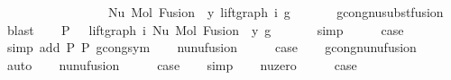 \begin{isabellebody}
\ \ \ \ \ \ \ \ \ \ \ \ \ \ \ \ \ Nu\ {\isacharparenleft}{\kern0pt}Mol\ {\isacharparenleft}{\kern0pt}Fusion\ {}\ y{\isacharparenright}{\kern0pt}\ {\isacharparenleft}{\kern0pt}lift{\isacharunderscore}{\kern0pt}graph\ i\ g{\isacharparenright}{\kern0pt}{\isacharparenright}{\kern0pt}{\isachardoublequoteclose}\isanewline
\ \ \ \ \ \isamarkupfalse%
\ gcong{\isachardot}{\kern0pt}nu{\isacharunderscore}{\kern0pt}subst{\isacharunderscore}{\kern0pt}fusion{}\ \isamarkupfalse%
\ blast\isanewline
\ \ \isamarkupfalse%
\ P{}{\isacharcolon}{\kern0pt}\ {\isachardoublequoteopen}{\isachardot}{\kern0pt}{\isachardot}{\kern0pt}{\isachardot}{\kern0pt}\ {\isacharequal}{\kern0pt}\ lift{\isacharunderscore}{\kern0pt}graph\ i\ {\isacharparenleft}{\kern0pt}Nu\ {\isacharparenleft}{\kern0pt}Mol\ {\isacharparenleft}{\kern0pt}Fusion\ {}\ y{\isacharparenright}{\kern0pt}\ g{\isacharparenright}{\kern0pt}{\isacharparenright}{\kern0pt}{\isachardoublequoteclose}\isanewline
\ \ \ \ \ \isamarkupfalse%
\ simp\isanewline
\ \ \isamarkupfalse%
\ \isamarkupfalse%
\ {\isacharquery}{\kern0pt}case\isanewline
\ \ \ \ \ \isamarkupfalse%
\ {\isacharparenleft}{\kern0pt}simp\ add{\isacharcolon}{\kern0pt}\ P{}\ P{}\ gcong{\isachardot}{\kern0pt}sym{\isacharparenright}{\kern0pt}\isanewline
{}\isamarkupfalse%
\isanewline
\ \ \isamarkupfalse%
\ nu{\isacharunderscore}{\kern0pt}nu{\isacharunderscore}{\kern0pt}fusion{}\isanewline
\ \ \isamarkupfalse%
\ \isamarkupfalse%
\ {\isacharquery}{\kern0pt}case\isanewline
\ \ \isamarkupfalse%
\ gcong{\isachardot}{\kern0pt}nu{\isacharunderscore}{\kern0pt}nu{\isacharunderscore}{\kern0pt}fusion{}\ \isamarkupfalse%
\ auto\isanewline
{}\isamarkupfalse%
\isanewline
\ \ \isamarkupfalse%
\ nu{\isacharunderscore}{\kern0pt}nu{\isacharunderscore}{\kern0pt}fusion{}\isanewline
\ \ \isamarkupfalse%
\ \isamarkupfalse%
\ {\isacharquery}{\kern0pt}case\isanewline
\ \ \isamarkupfalse%
\ simp\isanewline
{}\isamarkupfalse%
\isanewline
\ \ \isamarkupfalse%
\ nu{\isacharunderscore}{\kern0pt}zero\isanewline
\ \ \isamarkupfalse%
\ \isamarkupfalse%
\ {\isacharquery}{\kern0pt}case\isanewline

\end{isabellebody}
